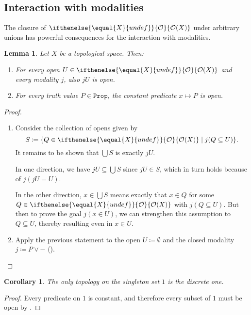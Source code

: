 \documentclass[reqno,11pt]{amsproc}
\theoremstyle{plain}
\newtheorem{corollary}[theorem]{Corollary}
\newtheorem{lemma}[theorem]{Lemma}
\theoremstyle{definition}
\newcommand{\Const}[1]{\mathtt{#1}}
\newcommand{\prop}{\Const{Prop}}
\newcommand{\Op}[1][undef]{\ifthenelse{\equal{#1}{undef}}{\mathcal{O}}{\mathcal{O}(#1)}}
\let\originalleft\left
\let\originalright\right
\renewcommand{\left}{\mathopen{}\mathclose\bgroup\originalleft}
\renewcommand{\right}{\aftergroup\egroup\originalright}
\numberwithin{equation}{section}
\begin{document}
\subsection{Interaction with modalities}

The closure of $\Op[X]$ under arbitrary unions has powerful consequences for the interaction with modalities.

\begin{lemma}
	\label{props_open}
	Let $X$ be a topological space. Then:
	\begin{enumerate}
		\item For every open $U \in \Op[X]$ and every modality $j$, also $jU$ is open.
		\item For every truth value $P \in \prop$, the constant predicate $x \mapsto P$ is open.
	\end{enumerate}
\end{lemma}

\begin{proof}
	\begin{enumerate}
		\item Consider the collection of opens given by 
			\[
				S \coloneqq \left\{ Q \in \Op[X] \mid j(Q \subseteq U) \right\}.
			\]
			It remains to be shown that $\bigcup S$ is exactly $jU$. 

			In one direction, we have $jU \subseteq \bigcup S$ since $jU \in S$, which in turn holds because of $j(jU = U)$.

			In the other direction, $x \in \bigcup S$ means exactly that $x \in Q$ for some $Q \in \Op[X]$ with $j(Q \subseteq U)$. But then to prove the goal $j(x \in U)$, we can strengthen this assumption to $Q \subseteq U$, thereby resulting even in $x \in U$.

		\item Apply the previous statement to the open $U \coloneqq \emptyset$ and the closed modality $j \coloneqq P \lor -$ (). \qedhere
	\end{enumerate}
\end{proof}

\begin{corollary}
	\label{top_on_one}
	The only topology on the singleton set $1$ is the discrete one.
\end{corollary}

\begin{proof}
	Every predicate on $1$ is constant, and therefore every subset of $1$ must be open by .
\end{proof}
\end{document}
